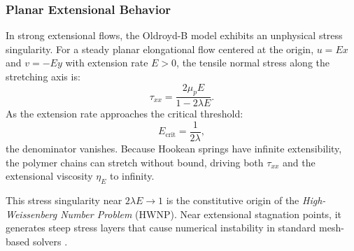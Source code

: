 \subsubsection{Planar Extensional Behavior}
\label{subsec:oldroyd_b_extensional_limits}
In strong extensional flows, the Oldroyd-B model exhibits an unphysical stress singularity.
For a steady planar elongational flow centered at the origin, $u = E x$ and $v = -E y$ with extension rate $E > 0$,
the tensile normal stress along the stretching axis is:
\begin{equation}
    \tau_{xx} = \frac{2\mu_p E}{1 - 2\lambda E} .
    \label{eq:oldroyd_normal_stresses_extensional}
\end{equation}
As the extension rate approaches the critical threshold:
\begin{equation}
    E_{\mathrm{crit}} = \frac{1}{2\lambda} ,
    \label{eq:ecrit}
\end{equation}
the denominator vanishes. Because Hookean springs have infinite extensibility,
the polymer chains can stretch without bound, driving both $\tau_{xx}$ and the extensional viscosity $\eta_E$ to infinity.

This stress singularity near $2\lambda E \to 1$ is the constitutive origin of the \textit{High-Weissenberg Number Problem} (HWNP).
Near extensional stagnation points, it generates steep stress layers that cause numerical instability in standard mesh-based solvers \cite{owens2002computational}.

